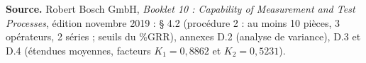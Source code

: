 \documentclass[10pt,a4paper]{article}
\begin{document}
\vfill
{\footnotesize\color{uimm}\textbf{Source.} Robert Bosch GmbH, \emph{Booklet 10 : Capability of Measurement and Test Processes}, édition novembre 2019 : § 4.2 (procédure 2 : au moins 10 pièces, 3 opérateurs, 2 séries ; seuils du \%GRR), annexes D.2 (analyse de variance), D.3 et D.4 (étendues moyennes, facteurs $K_1 = 0{,}8862$ et $K_2 = 0{,}5231$).}
\end{document}
